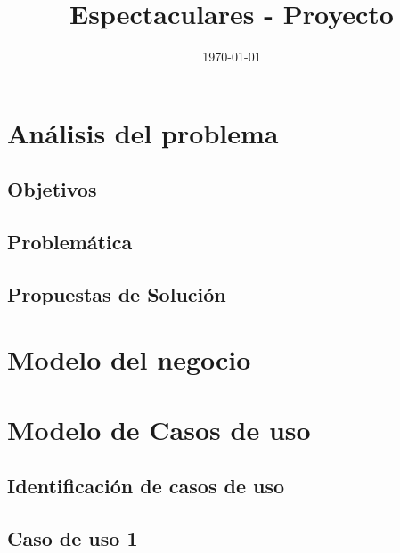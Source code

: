 \documentclass[a4paper]{article}
\title{Espectaculares - Proyecto}
\author{}
\date{\today}
\begin{document}
	\tableofcontents %
	\newpage

	
	
	\section{Análisis del problema} %
		\subsection{Objetivos}	%
			
			
		
		\subsection{Problemática} %
			
			
			
			

		\subsection{Propuestas de Solución} %
			
			
			
			
				
			
			


	\section{Modelo del negocio}
		\subsection{}
	\section{Modelo de Casos de uso}
		\subsection{Identificación de casos de uso}
		\subsection{Caso de uso 1}
\end{document}
